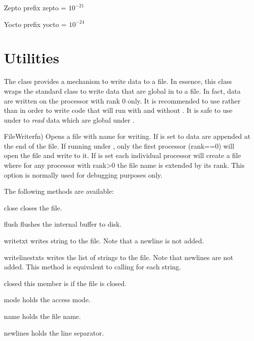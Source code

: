 \begin{datadesc}{Zepto}
prefix zepto = $10^{-21}$
\end{datadesc}

\begin{datadesc}{Yocto}
prefix yocto = $10^{-24}$
\end{datadesc}

\section{Utilities}
The  class provides a mechanism to write data to a file.
In essence, this class wraps the standard \PYTHON {} class to write
data that are global in \MPI to a file. In fact, data are written on the
processor with \MPI rank 0 only. It is recommended to use 
rather than  in order to write code that will run with and without
\MPI. It is safe to use  under \MPI to \emph{read} data which are
global under \MPI.

\begin{classdesc}{FileWriter}{fn)}
Opens a file with name  for writing. If  is set to \True
data are appended at the end of the file.
If running under \MPI, only the first processor (rank==0) will open the file
and write to it.
If  is set each individual processor will create a file
where for any processor with rank>0 the file name is extended by its rank.
This option is normally used for debugging purposes only.
\end{classdesc}

\noindent The following methods are available:
\begin{methoddesc}[FileWriter]{close}{}
closes the file.
\end{methoddesc}
\begin{methoddesc}[FileWriter]{flush}{}
flushes the internal buffer to disk.
\end{methoddesc}
\begin{methoddesc}[FileWriter]{write}{txt}
writes string  to the file. Note that a newline is not added.
\end{methoddesc}
\begin{methoddesc}[FileWriter]{writelines}{txts}
writes the list  of strings to the file.
Note that newlines are not added.
This method is equivalent to calling  for each string.
\end{methoddesc}
\begin{memberdesc}[FileWriter]{closed}
this member is \True if the file is closed.
\end{memberdesc}
\begin{memberdesc}[FileWriter]{mode}
holds the access mode.
\end{memberdesc}
\begin{memberdesc}[FileWriter]{name}
holds the file name.
\end{memberdesc}
\begin{memberdesc}[FileWriter]{newlines}
holds the line separator.
\end{memberdesc}

